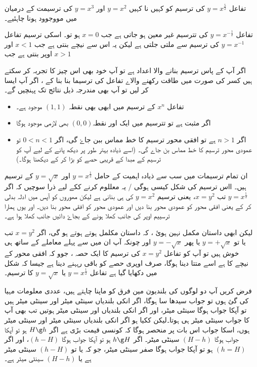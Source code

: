 تفاعل \(y=x^{\frac{5}{2}}\) کی ترسیم کو کہیں نا کہیں  \(y=x^{2}   \) اور  \(  y=x^{3}\) کی ترسیمت کے درمیان میں مووجوود ہونا چاہئیے۔

تفاعل  \( y=x^{-\frac{1}{2}}   \) کی تترسیم غیر معین ہو جاتی ہے جب \(   x=0\) ہو تو۔ اسکی ترسیم تفاعل \(y=x^{-1}  \) کی ترسیم سے ملتی جلتی ہے لیکن یہ اس سے نیچے بنتی ہے جب  \( x<1  \) اور اوپر بنتی ہے جب \(     x>1\)

اگر آپ کے پاس ترسیم بنانے والا اعداد ہے تو آپ خود بھی اس چیز کا تجربہ کر سکتے ہیں کسر کی صورت میں طاقت رکھنے والاے تفاعل کی ترسیما بنا بنا کے ، اگر آپ ایسا کر لیں تو آپ بھی مندرجہ ذیل نتائج تک پہنچیں گے۔
\begin{itemize}
\item  
تفاعل  \( x^{n}  \) کے ترسیم میں ابھی بھی نقطہ \(   (1,1)\) موجود ہے۔ 
\item  
اگر  مثبت ہے تو تترسیم میں ایک اور نقطہ\((0,0)\) بھی لازمی موجود ہوگا 
\item 
 اگر \(n>1   \) ہے تو افقی محور ترسیم کا خط مماس ببن جاۓ گی، اگر \(   0<n<1\) تو  عمودی محور ترسیم کا خط مماس بن جاے گی۔ (اسے ذیادہ بہتر طور پر دیکھ پانے کے لیے آپ کو ترسیم کے مبدا کے قریبی حصے کو بڑا کر کے دیکھنا ہوگا۔)
\end{itemize}
  
ان تمام ترسیمات میں سب سے ذیادہ اہمیت کے حامل \(y=x^{\frac{1}{2}}  \)  اور \(   y=\sqrt{x}\) کے ترسیم ہیں۔ ااس ترسیم کی شکل کیسی ہوگی / یہ معللوم کرنے ککے لیے ذرا سوچیں کہ اگر \( y=x^{\frac{1}{2}}  \) تب \( x=y^{2}  \)، یعنی ترسیم \(   y=x^{2}\) کی ہی بنانی ہے لیکن مھوروں کو آپس میں ادلہ بدلی کر کے یعنی افقی محور کو عمودی محور بنا دیں اور عمودی محور کو افقی محور بنا دیں۔ اور یوں ہمارا ترسییم اوپر کی جانب کھلا ہونے کے بجاۓ دائیں جانب کھلا ہوا ہے۔ 

لیکن ابھی داستان مکمل نہین ہوئ ، کہ داستان مکلمل ہوتے ہوتے ہو گی، اگر \( x=y^{2}  \) تب یا تو \(  y=+\sqrt{x}  \) یا پھر \(  y=-\sqrt{x}  \) اور چونکہ آپ ان میں سے پہلے معاملے کے ساتھ ہی خوش ہیں تو آپ کو تفاعل \( x=y^{2}  \) کی ترسیم کا ایک حصہ ، جوو کہ افقی محور کے نیچے کا ہے اسے متتا  دینا ہوگا، صرف اوپری حصے کو باقی رہہنے دینا ہے جیسا کہ شکل  میں دکھایا گیا ہے تفاعل \( y=x^{\frac{1}{2}}   \) یا \(      y=\sqrt{x} \) کا ترسیم۔
 

 فرض کریں آپ دو لوگوں کی بلندیون مین فرق کو ماپنا چاہتے ہیں، عددی معلومات مہیا کی گئ ہوں تو جواب سیدھا سا ہوگا، اگر انکی بلندیاں  سینٹی میٹر اور  سینٹی میٹر ہیں تو آپکا جواب ہوگا  سینٹی میٹر، اور اگر انکی بلندیاں  اور  سینٹی میٹر ہوتیں تب بھی آپ کا جواب  سینٹی میٹر ہی ہوتا۔لیکن ککیا ہو اگر انکی بلندیاں  سینٹی میٹر اور  سینٹی میٹر ہوں، اسکا جواب اس بات پر منحصر ہوگا کہ کونسی قیمت بڑی ہے اگر \( H\g h \) ہو تو آپکا جواب ہوگا \((H-h)  \) سینٹی میٹر۔  اگر \( h\g H \) ہو تو آپکا جواب ہوگا \((h-H)  \)،  اور اگر\((h=H)  \) ہو تو آپکا جواب ہوگا صفر سینٹی میٹر، جو کہ یا تو \((h-H)  \) سینٹی میٹر ہے یا  \((H-h)  \) سینٹی میٹر ہے۔

